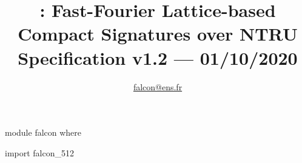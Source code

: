 \documentclass[letterpaper,12pt]{book}
\title{\falcon: Fast-Fourier Lattice-based\\Compact Signatures over NTRU\\
\textsf{\large Specification v1.2 --- 01/10/2020}}
\author{%
\pierrealain \and%
\jeffrey \and%
\paul \and%
\vadim \and%
\thomaspo \and%
\thomaspr \and%
\thomasr \and%
\gregor \and%
\william \and%
\zhenfei
}
\date{\href{falcon@ens.fr}{\textsf{falcon@ens.fr}}}
\begin{document}
\maketitle

{
\setlength{\parskip}{.3ex}
\tableofcontents
}

\begin{code}
  module falcon where

  import falcon_512
\end{code}

% 






% 
\appendix
% 

{\small
}
\end{document}
